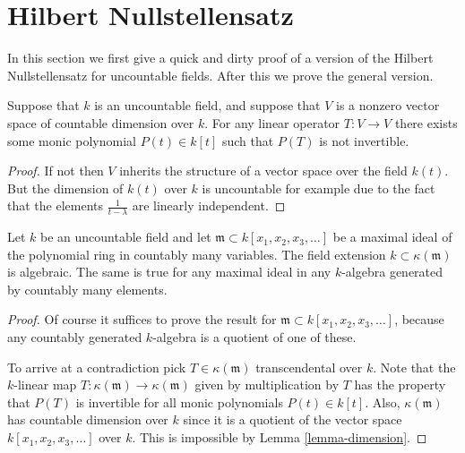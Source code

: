 \section{Hilbert Nullstellensatz}
\label{section-nullstellensatz}

\noindent
In this section we first give a quick and dirty proof
of a version of the Hilbert Nullstellensatz for uncountable
fields. After this we prove the general version.

\begin{lemma}
\label{lemma-dimension}
Suppose that $k$ is an uncountable field,
and suppose that $V$ is a nonzero vector
space of countable dimension over $k$.
For any linear operator $T : V \to V$ there exists
some monic polynomial $P(t) \in k[t]$ such that
$P(T)$ is not invertible.
\end{lemma}

\begin{proof}
If not then $V$ inherits the structure of a vector space over
the field $k(t)$. But the dimension of $k(t)$ over $k$ is
uncountable for example due to the fact that the elements
$\frac{1}{t - \lambda}$ are linearly independent.
\end{proof}

\begin{theorem}
\label{theorem-uncountable-nullstellensatz}
Let $k$ be an uncountable field and let $\mathfrak m \subset
k[x_1, x_2, x_3, \ldots]$ be a maximal ideal of the polynomial
ring in countably many variables.
The field extension $k \subset \kappa(\mathfrak m)$
is algebraic. The same is true for any maximal ideal in
any $k$-algebra generated by countably many elements.
\end{theorem}

\begin{proof}
Of course it suffices to prove the result for $\mathfrak m \subset
k[x_1, x_2, x_3, \ldots]$, because any countably generated $k$-algebra
is a quotient of one of these.

\medskip\noindent
To arrive at a contradiction pick
$T \in \kappa(\mathfrak m)$ transcendental over $k$.
Note that the $k$-linear map $T : \kappa(\mathfrak m)
\to \kappa(\mathfrak m)$ given by multiplication by $T$
has the property that $P(T)$ is invertible for all
monic polynomials $P(t) \in k[t]$.
Also, $\kappa(\mathfrak m)$ has countable dimension
over $k$ since it is a quotient of the vector space
$k[x_1, x_2, x_3, \ldots]$ over $k$.
This is impossible by Lemma \ref{lemma-dimension}.
\end{proof}


